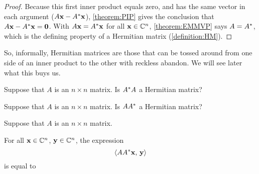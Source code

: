 \documentclass{ximera}
\begin{document}
\begin{theorem}
\begin{proof}
  Because this first inner product equals zero, and has the same
  vector in each argument ($A\mathbf{x}-A^\ast\mathbf{x}$),
  \ref{theorem:PIP} gives the conclusion that
  $A\mathbf{x}-A^\ast\mathbf{x}=\mathbf{0}$.  With
  $A\mathbf{x}=A^\ast\mathbf{x}$ for all $\mathbf{x}\in\mathbb{C}^{n}$,
  \ref{theorem:EMMVP} says $A=A^\ast$, which is the defining
  property of a Hermitian matrix (\ref{definition:HM}).
\end{proof}
\end{theorem}

So, informally, Hermitian matrices are those that can be tossed around from one side of an inner product to the other with reckless abandon.  We will see later what this buys us.

\begin{question}
  Suppose that $A$ is an $n\times n$ matrix.  Is $A^\ast A$ a Hermitian matrix?
  
  \begin{multipleChoice}
  \end{multipleChoice}
\end{question}

\begin{question}
  Suppose that $A$ is an $n\times n$ matrix.  Is $AA^\ast$ a Hermitian matrix?
  
  \begin{multipleChoice}
  \end{multipleChoice}
\end{question}

\begin{question}
  Suppose that $A$ is an $n\times n$ matrix.

  For all 
  $\mathbf{x}\in\mathbb{C}^{n}$, $\mathbf{y}\in\mathbb{C}^{n}$, the expression
  \[
    \left\langle AA^\ast\mathbf{x},\,\mathbf{y}\right\rangle
  \] is equal to
  \begin{multipleChoice}
  \end{multipleChoice}
\end{question}
\end{document}
